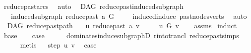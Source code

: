 \begin{isabellebody}
\ reduce{\isacharunderscore}{\kern0pt}past{\isacharunderscore}{\kern0pt}arcs\ \isamarkupfalse%
\ auto%
\endisatagproof
{\isafoldproof}%
%
\isadelimproof
\isanewline
%
\endisadelimproof
\isanewline
{}\isamarkupfalse%
\ {\isacharparenleft}{\kern0pt}\ DAG{\isacharparenright}{\kern0pt}\ reduce{\isacharunderscore}{\kern0pt}past{\isacharunderscore}{\kern0pt}induced{\isacharunderscore}{\kern0pt}subgraph{\isacharcolon}{\kern0pt}\isanewline
\ \ \ {\isachardoublequoteopen}induced{\isacharunderscore}{\kern0pt}subgraph\ {\isacharparenleft}{\kern0pt}reduce{\isacharunderscore}{\kern0pt}past\ a{\isacharparenright}{\kern0pt}\ G{\isachardoublequoteclose}\isanewline
%
\isadelimproof
\ \ %
\endisadelimproof
%
\isatagproof
{}\isamarkupfalse%
\ \ induced{\isacharunderscore}{\kern0pt}induce\ past{\isacharunderscore}{\kern0pt}nodes{\isacharunderscore}{\kern0pt}verts\ \isamarkupfalse%
\ auto%
\endisatagproof
{\isafoldproof}%
%
\isadelimproof
\isanewline
%
\endisadelimproof
\isanewline
{}\isamarkupfalse%
\ {\isacharparenleft}{\kern0pt}\ DAG{\isacharparenright}{\kern0pt}\ reduce{\isacharunderscore}{\kern0pt}past{\isacharunderscore}{\kern0pt}path{\isacharcolon}{\kern0pt}\isanewline
\ \ \ {\isachardoublequoteopen}u\ {\isasymrightarrow}\isactrlsup {\isacharplus}{\kern0pt}\isactrlbsub reduce{\isacharunderscore}{\kern0pt}past\ a\isactrlesub \ v{\isachardoublequoteclose}\ \isanewline
\ \ \ {\isachardoublequoteopen}\ u\ {\isasymrightarrow}\isactrlsup {\isacharplus}{\kern0pt}\isactrlbsub G\isactrlesub \ v{\isachardoublequoteclose}\isanewline
%
\isadelimproof
\ \ %
\endisadelimproof
%
\isatagproof
{}\isamarkupfalse%
\ assms\isanewline
{}\isamarkupfalse%
\ induct\isanewline
\ \ \isamarkupfalse%
\ base\ \isamarkupfalse%
\ \isamarkupfalse%
\ {\isacharquery}{\kern0pt}case\isanewline
\ \ \ \ \isamarkupfalse%
\ dominates{\isacharunderscore}{\kern0pt}induce{\isacharunderscore}{\kern0pt}subgraphD\ r{\isacharunderscore}{\kern0pt}into{\isacharunderscore}{\kern0pt}trancl{\isacharprime}{\kern0pt}\ reduce{\isacharunderscore}{\kern0pt}past{\isachardot}{\kern0pt}simps\isanewline
\ \ \ \ \isamarkupfalse%
\ metis\isanewline
{}\isamarkupfalse%
\ \isamarkupfalse%
\ {\isacharparenleft}{\kern0pt}step\ u\ v{\isacharparenright}{\kern0pt}\ \isamarkupfalse%
\ {\isacharquery}{\kern0pt}case\isanewline

\end{isabellebody}
